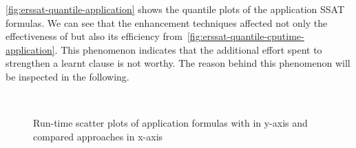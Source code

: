 \cref{fig:erssat-quantile-application} shows the quantile plots of the application SSAT formulas.
We can see that the enhancement techniques affected not only the effectiveness of \erssat but also its efficiency
from~\cref{fig:erssat-quantile-cputime-application}.
This phenomenon indicates that the additional effort spent to strengthen a learnt clause is not worthy.
The reason behind this phenomenon will be inspected in the following.

\begin{figure}[hp]
    \centering
    \\
    \caption{Run-time scatter plots of application formulas with \erssat in y-axis and compared approaches in x-axis}
    \label{fig:erssat-scatter-application}
\end{figure}

